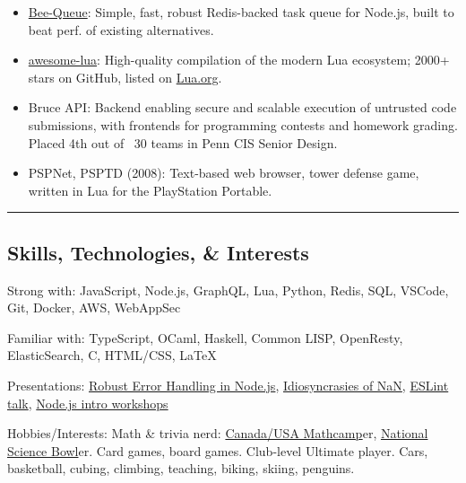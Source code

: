 \documentclass[10pt,letterpaper]{article}
\newenvironment{indentsection}[1]%
{\begin{list}{}%
	{\setlength{\leftmargin}{#1}}%
	\item[]%
}
{\end{list}}
\begin{document}
\begin{itemize}
	\parskip=-0.1em

	\item
	\href{https://github.com/bee-queue/bee-queue}{Bee-Queue}: Simple, fast, robust Redis-backed task queue for Node.js, built to beat perf. of existing alternatives. 

	\item
	\href{https://github.com/LewisJEllis/awesome-lua}{awesome-lua}: High-quality compilation of the modern Lua ecosystem; 2000+ stars on GitHub, listed on \href{https://www.lua.org/start.html}{Lua.org}.

	\item
	Bruce API: Backend enabling secure and scalable execution of untrusted code submissions, with frontends for programming contests and homework grading. Placed 4th out of ~30 teams in Penn CIS Senior Design.

	\item
	PSPNet, PSPTD (2008): Text-based web browser, tower defense game, written in Lua for the PlayStation Portable.
\end{itemize}


\hrule
\vspace{-0.7em}
\subsection*{Skills, Technologies, \& Interests}

\begin{indentsection}{\parindent}
\begin{description*}
	\item[Strong with:] JavaScript, Node.js, GraphQL, Lua, Python, Redis, SQL, VSCode, Git, Docker, AWS, WebAppSec
	\item[Familiar with:] TypeScript, OCaml, Haskell, Common LISP, OpenResty, ElasticSearch, C, HTML/CSS, \LaTeX
	\item[Presentations:] \href{https://speakerdeck.com/lewisjellis/robust-error-handling-in-node-dot-js}{Robust Error Handling in Node.js}, \href{https://speakerdeck.com/lewisjellis/idiosyncrasies-of-nan-v2}{Idiosyncrasies of NaN}, \href{https://github.com/LewisJEllis/eslint101}{ESLint talk}, \href{https://github.com/LewisJEllis/nodejs-workshops}{Node.js intro workshops}
	\item[Hobbies/Interests:] Math \& trivia nerd: \href{http://mathcamp.org/}{Canada/USA Mathcamp}er, \href{https://science.energy.gov/wdts/nsb/about/}{National Science Bowl}er. Card games, board games. Club-level Ultimate player. Cars, basketball, cubing, climbing, teaching, biking, skiing, penguins.
\end{description*}
\end{indentsection}
\end{document}
